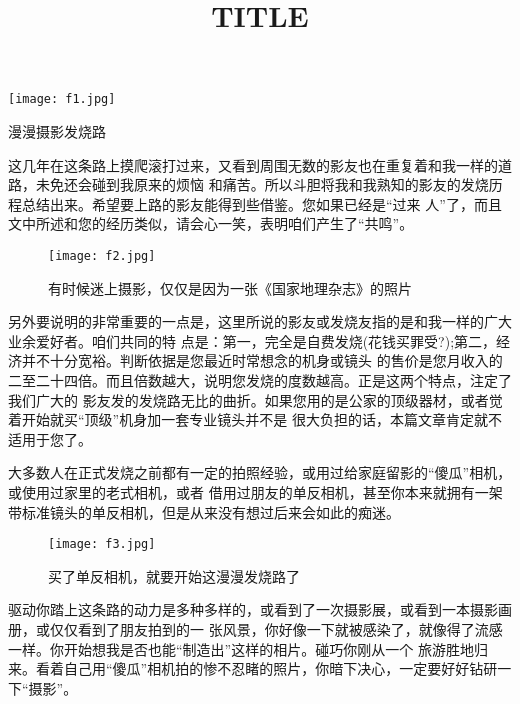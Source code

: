 ﻿\documentclass[12pt,a4paper,onecolumn]{article}
\title{TITLE}
\author{}
\date{}
\begin{document}
\pagestyle{empty}
\begin{center}
\texttt{[image: f1.jpg]}
\newline
\newline
\end{center}

\begin{center}
\textsf{\Huge{漫漫摄影发烧路} }
\end{center}

\pagebreak
\pagestyle{fancy}


这几年在这条路上摸爬滚打过来，又看到周围无数的影友也在重复着和我一样的道路，未免还会碰到我原来的烦恼
和痛苦。所以斗胆将我和我熟知的影友的发烧历程总结出来。希望要上路的影友能得到些借鉴。您如果已经是“过来
人”了，而且文中所述和您的经历类似，请会心一笑，表明咱们产生了“共鸣”。


\begin{wrapfigure}{l}{0.5\textwidth}
\vspace{-2ex}
\texttt{[image: f2.jpg]}
\caption{有时候迷上摄影，仅仅是因为一张《国家地理杂志》的照片}
\vspace{-2ex}
\end{wrapfigure}


另外要说明的非常重要的一点是，这里所说的影友或发烧友指的是和我一样的广大业余爱好者。咱们共同的特
点是：第一，完全是自费发烧(花钱买罪受?);第二，经济并不十分宽裕。判断依据是您最近时常想念的机身或镜头
的售价是您月收入的二至二十四倍。而且倍数越大，说明您发烧的度数越高。正是这两个特点，注定了我们广大的
影友发的发烧路无比的曲折。如果您用的是公家的顶级器材，或者觉着开始就买“顶级”机身加一套专业镜头并不是
很大负担的话，本篇文章肯定就不适用于您了。


大多数人在正式发烧之前都有一定的拍照经验，或用过给家庭留影的“傻瓜”相机，或使用过家里的老式相机，或者
借用过朋友的单反相机，甚至你本来就拥有一架带标准镜头的单反相机，但是从来没有想过后来会如此的痴迷。

\begin{wrapfigure}{r}{0.5\textwidth}
\vspace{-2ex}
\texttt{[image: f3.jpg]}
\caption{买了单反相机，就要开始这漫漫发烧路了}
\vspace{-2ex}
\end{wrapfigure}


驱动你踏上这条路的动力是多种多样的，或看到了一次摄影展，或看到一本摄影画册，或仅仅看到了朋友拍到的一
张风景，你好像一下就被感染了，就像得了流感一样。你开始想我是否也能“制造出”这样的相片。碰巧你刚从一个
旅游胜地归来。看着自己用“傻瓜”相机拍的惨不忍睹的照片，你暗下决心，一定要好好钻研一下“摄影”。
\end{document}
